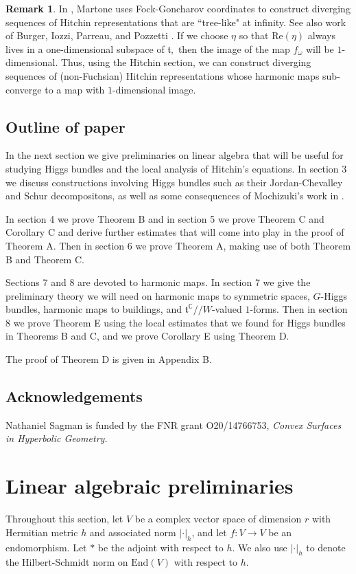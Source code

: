\documentclass[10pt]{amsart}
\newcommand{\ft}{\mathfrak{t}}
\theoremstyle{definition}
\newtheorem{remark}[thm]{Remark}
\DeclareMathOperator{\C}{\mathbb{C}}
\begin{document}
\begin{remark}
    In \cite{Ma}, Martone uses Fock-Goncharov coordinates to construct diverging sequences of Hitchin representations that are ``tree-like" at infinity. See also work of Burger, Iozzi, Parreau, and Pozzetti \cite{BIPP}. If we choose $\eta$ so that $\textrm{Re}(\eta)$ always lives in a one-dimensional subspace of $\ft,$ then the image of the map $f_\omega$ will be $1$-dimensional. Thus, using the Hitchin section, we can construct diverging sequences of (non-Fuchsian) Hitchin representations whose harmonic maps sub-converge to a map with $1$-dimensional image.
\end{remark}



\subsection{Outline of paper}
In the next section we give preliminaries on linear algebra that will be useful for studying Higgs bundles and the local analysis of Hitchin's equations. In section 3 we discuss constructions involving Higgs bundles such as their Jordan-Chevalley and Schur decompositons, as well as some consequences of Mochizuki's work in \cite{Mo}.

In section 4 we prove Theorem B and in section 5 we prove Theorem C and Corollary C and derive further estimates that will come into play in the proof of Theorem A. Then in section 6 we prove Theorem A, making use of both Theorem B and Theorem C.

Sections 7 and 8 are devoted to harmonic maps. In section 7 we give the preliminary theory we will need on harmonic maps to symmetric spaces, $G$-Higgs bundles, harmonic maps to buildings, and $\ft^{\C}//W$-valued $1$-forms. Then in section 8 we prove Theorem E using the local estimates that we found for Higgs bundles in Theorems B and C, and we prove Corollary E using Theorem D. 

The proof of Theorem D is given in Appendix B.

\subsection{Acknowledgements}
Nathaniel Sagman is funded by the FNR grant O20/14766753, \textit{Convex Surfaces in Hyperbolic Geometry.}


\section{Linear algebraic preliminaries}
Throughout this section, let $V$ be a complex vector space of dimension $r$ with Hermitian metric $h$ and associated norm $|\cdot|_h$, and let $f:V\to V$ be an endomorphism. Let $*$ be the adjoint with respect to $h$. We also use $|\cdot|_h$ to denote the Hilbert-Schmidt norm on $\mathrm{End}(V)$ with respect to $h$.
\end{document}
